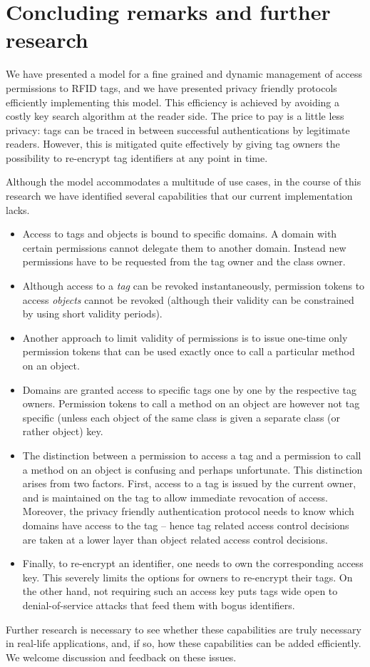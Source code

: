 \section{Concluding remarks and further research}
\label{sec-concl}

We have presented a model for a fine grained and dynamic management of access
permissions to RFID tags, and we have presented privacy friendly protocols
efficiently implementing this model. This efficiency is achieved by avoiding a costly key search algorithm at the reader side. The price to pay is a little less privacy: tags can be traced in between successful authentications by legitimate readers. However, this is mitigated quite effectively by giving tag owners the possibility to re-encrypt tag identifiers at any point in time.

Although the model accommodates a multitude
of use cases, in the course of this research we have identified several
capabilities that our current implementation lacks. 
\begin{itemize}
\fixlistspacing
\item Access to tags and objects is bound to specific domains.
  A domain with certain permissions cannot delegate them to another domain.
  Instead new permissions have to be requested from the tag owner and the class
  owner. 

\item Although access to a \emph{tag} can be revoked instantaneously, permission
  tokens to access \emph{objects} cannot be revoked (although their validity
  can be constrained by using short validity periods).

\item Another approach to limit validity of permissions is to issue one-time
  only permission tokens that can be used exactly once to call a particular
  method on an object.

\item Domains are granted access to specific tags one by one by the respective
  tag owners. Permission tokens to call a method on an object are however not
  tag specific (unless each object of the same class is given a separate class
  (or rather object) key.

\item The distinction between a permission to access a tag and a permission to
  call a method on an object is confusing and perhaps unfortunate. 
  This distinction arises from two factors. First, access to a tag is issued by
  the current owner, and is maintained on the tag to allow immediate
  revocation of access. Moreover, the privacy friendly authentication protocol
  needs to know which domains have access to the tag -- hence tag related
  access control decisions are taken at a lower layer than object related
  access control decisions.
\item Finally, to re-encrypt an identifier, one needs to own the corresponding access key. This severely limits the options for owners to re-encrypt their tags. On the other hand, not requiring such an access key puts tags wide open
to denial-of-service attacks that feed them with bogus identifiers.
\end{itemize}
Further research is
necessary to see whether these capabilities are truly necessary in real-life
applications, and, if so, how these capabilities can be added efficiently.
We welcome discussion and feedback on these issues.



